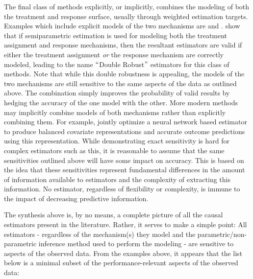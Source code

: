\documentclass[../main.tex]{subfiles}
\begin{document}
\vspace{\baselineskip}
The final class of methods explicitly, or implicitly, combines the modeling of both the treatment and response surface, usually through weighted estimation targets. Examples which include explicit models of the two mechanisms are \cite{Rubin2000CombiningCovariates} and \cite{Robins1995SemiparametricData}. \cite{Scharfstein1999AdjustingRejoinder} show that if semiparametric estimation is used for modeling both the treatment assignment and response mechanisms, then the resultant estimators are valid if either the treatment assignment \textit{or }the response mechanism are correctly modeled, leading to the name $``$Double Robust$"$  estimators for this class of methods. Note that while this double robustness is appealing, the models of the two mechanisms are still sensitive to the same aspects of the data as outlined above. The combination simply improves the probability of valid results by hedging the accuracy of the one model with the other. More modern methods may implicitly combine models of both mechanisms rather than explicitly combining them. For example, \cite{Johansson2016LearningInference} jointly optimize a neural network based estimator to produce balanced covariate representations and accurate outcome predictions using this representation. While demonstrating exact sensitivity is hard for complex estimators such as this, it is reasonable to assume that the same sensitivities outlined above will have some impact on accuracy. This is based on the idea that these sensitivities represent fundamental differences in the amount of information available to estimators and the complexity of extracting this information. No estimator, regardless of flexibility or complexity, is immune to the impact of decreasing predictive information.\par


\vspace{\baselineskip}
The synthesis above is, by no means, a complete picture of all the causal estimators present in the literature. Rather, it serves to make a simple point: All estimators - regardless of the mechanism(s) they model and the parametric/non-parametric inference method used to perform the modeling - are sensitive to aspects of the observed data. From the examples above, it appears that the list below is a minimal subset of the performance-relevant aspects of the observed data:\par
\end{document}
